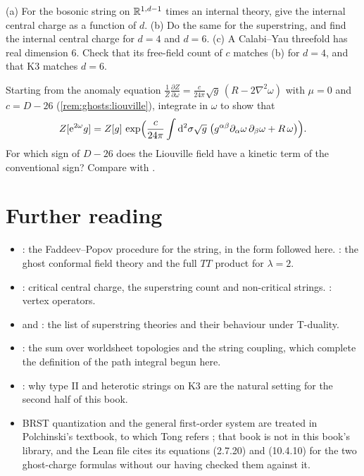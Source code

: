\begin{exercise}[$\star\star$]\label{exr:ghosts:internal}
(a) For the bosonic string on $\mathbb{R}^{1,d-1}$ times an internal theory, give the internal central
charge as a function of $d$. (b) Do the same for the superstring, and find the internal central
charge for $d=4$ and $d=6$. (c) A Calabi--Yau threefold has real dimension $6$. Check that its
free-field count of $c$ matches (b) for $d=4$, and that K3 matches $d=6$.
\end{exercise}

\begin{exercise}[$\star\star\star$]\label{exr:ghosts:liouville}
Starting from the anomaly equation
$\frac{1}{Z}\frac{\partial Z}{\partial\omega}=\frac{c}{24\pi}\sqrt g\,(R-2\nabla^2\omega)$
with $\mu=0$ and $c=D-26$ (\cref{rem:ghosts:liouville}), integrate in $\omega$ to show that
\[
  Z[\mathrm{e}^{2\omega}g]=Z[g]\,\exp\Bigl(\frac{c}{24\pi}\int\mathrm{d}^2\sigma\sqrt g\;
  \bigl(g^{\alpha\beta}\partial_\alpha\omega\,\partial_\beta\omega+R\,\omega\bigr)\Bigr).
\]
For which sign of
$D-26$ does the Liouville field have a kinetic term of the conventional sign? Compare with
.
\end{exercise}

\section*{Further reading}

\begin{itemize}[leftmargin=*,itemsep=2pt]
\item {}: the Faddeev--Popov procedure for the string, in the
  form followed here. : the ghost conformal field theory and
  the full $TT$ product for $\lambda=2$.
\item {}: critical central charge, the superstring count and
  non-critical strings. : vertex operators.
\item {} and : the list
  of superstring theories and their behaviour under T-duality.
\item {}: the sum over worldsheet topologies and the string
  coupling, which complete the definition of the path integral begun here.
\item {}: why type II and heterotic strings on K3 are the natural
  setting for the second half of this book.
\item BRST quantization and the general first-order system are treated in Polchinski's
  textbook, to which Tong refers ; that book is not in
  this book's library, and the Lean file cites its equations (2.7.20) and (10.4.10) for the
  two ghost-charge formulas without our having checked them against it.
\end{itemize}
